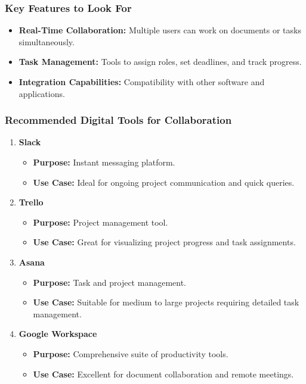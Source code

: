 \documentclass[aspectratio=169]{beamer}
\begin{document}
\begin{frame}[fragile]
    \frametitle{Key Features to Look For}
    \begin{itemize}
        \item \textbf{Real-Time Collaboration:} Multiple users can work on documents or tasks simultaneously.
        \item \textbf{Task Management:} Tools to assign roles, set deadlines, and track progress.
        \item \textbf{Integration Capabilities:} Compatibility with other software and applications.
    \end{itemize}
\end{frame}

\begin{frame}[fragile]
    \frametitle{Recommended Digital Tools for Collaboration}
    \begin{enumerate}
        \item \textbf{Slack}
        \begin{itemize}
            \item \textbf{Purpose:} Instant messaging platform.
            \item \textbf{Use Case:} Ideal for ongoing project communication and quick queries.
        \end{itemize}

        \item \textbf{Trello}
        \begin{itemize}
            \item \textbf{Purpose:} Project management tool.
            \item \textbf{Use Case:} Great for visualizing project progress and task assignments.
        \end{itemize}

        \item \textbf{Asana}
        \begin{itemize}
            \item \textbf{Purpose:} Task and project management.
            \item \textbf{Use Case:} Suitable for medium to large projects requiring detailed task management.
        \end{itemize}

        \item \textbf{Google Workspace}
        \begin{itemize}
            \item \textbf{Purpose:} Comprehensive suite of productivity tools.
            \item \textbf{Use Case:} Excellent for document collaboration and remote meetings.
        \end{itemize}


\end{enumerate}
\end{frame}
\end{document}
